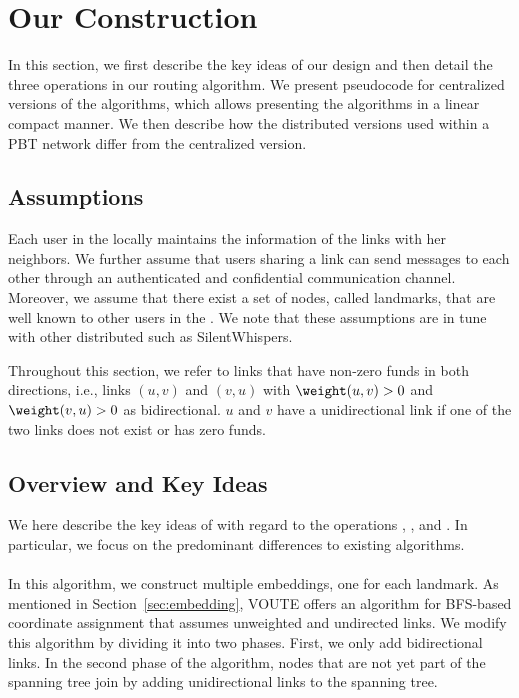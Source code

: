  
 

\section{Our Construction}
\label{sec:algo}

In this section, we first describe the key ideas of our design and then detail  the three operations in our routing algorithm. We present pseudocode for centralized versions of the algorithms, which allows presenting the algorithms in a linear compact manner. We then describe how the distributed versions used within a PBT network differ from the centralized version. 

\subsection{Assumptions}  
Each user in the \paysys locally maintains the information of the links with her neighbors. We 
further assume that users sharing a link can send messages to each other through an 
authenticated and confidential communication channel. Moreover, we assume that there exist 
a set of nodes, called landmarks, that are well known to other users in the 
\paysys. We note that these assumptions are in tune with other distributed \paysyss such as 
SilentWhispers.

Throughout this section, we refer to links that have non-zero funds in both directions, i.e., links $(u,v)$ and $(v,u)$
with $\weight(u,v)>0$ and $\weight(v,u)>0$ as bidirectional. $u$ and $v$ have a unidirectional link if one of the two links does not exist or has zero funds. 

\subsection{Overview and Key Ideas}

We here describe the key ideas of \oursys with regard to the operations \setRoute, \setC, and \routePay.
In particular, we focus on the predominant differences to existing algorithms. 

\paragraph*{\setRoute}  
In this algorithm, we construct multiple embeddings, one for each landmark. 
As mentioned in Section~\ref{sec:embedding}, VOUTE offers an algorithm for BFS-based coordinate assignment that assumes unweighted and undirected links. We modify this algorithm by dividing it into two phases.
First, we only add bidirectional links. In the second phase of the algorithm, nodes that are not yet part of the spanning tree join by adding unidirectional links to the spanning tree.  
 


